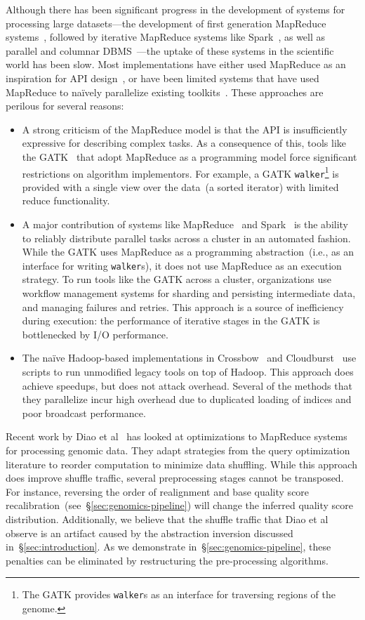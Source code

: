 \documentclass{acm_proc_article-sp}
\begin{document}
Although there has been significant progress in the development of systems for processing large
datasets---the development of first generation MapReduce systems~\cite{dean04}, followed by
iterative MapReduce systems like Spark~\cite{zaharia10}, as well as parallel and columnar
DBMS~\cite{abadi06, lamb12}---the uptake of these systems in the scientific world has been slow.
Most implementations have either used MapReduce as an inspiration for API
design~\cite{mckenna10}, or have been limited systems that have used MapReduce to na\"{i}vely
parallelize existing toolkits~\cite{langmead09, schatz09}. These approaches are perilous for several
reasons:

\begin{itemize}
\item A strong criticism of the MapReduce model is that the API is insufficiently expressive
for describing complex tasks. As a consequence of this, tools like the GATK~\cite{mckenna10} that
adopt MapReduce as a programming model force significant restrictions on algorithm implementors. For
example, a GATK \texttt{walker}\footnote{The GATK provides \texttt{walker}s as an interface for
traversing regions of the genome.} is provided with a single view over the data~(a sorted iterator) with limited reduce
functionality.
\item A major contribution of systems like MapReduce~\cite{dean08} and Spark~\cite{zaharia10,
zaharia12} is the ability to reliably distribute parallel tasks across a cluster in an automated fashion. While
the GATK uses MapReduce as a programming abstraction~(i.e., as an interface for writing
\texttt{walker}s), it does not use MapReduce as an execution strategy. To run tools like the GATK across
a cluster, organizations use workflow management systems for sharding and persisting intermediate
data, and managing failures and retries. This approach is a source of inefficiency during execution: the performance of
iterative stages in the GATK is bottlenecked by I/O performance.
\item The na\"{i}ve Hadoop-based implementations in Crossbow~\cite{langmead09} and
Cloudburst~\cite{schatz09} use scripts to run unmodified legacy tools on top of Hadoop. This approach does
achieve speedups, but does not attack overhead. Several of the methods that they parallelize incur
high overhead due to duplicated loading of indices and poor broadcast performance.
\end{itemize}

Recent work by Diao et al~\cite{diao15} has looked at optimizations to MapReduce systems for
processing genomic data. They adapt strategies from the query optimization literature to reorder
computation to minimize data shuffling. While this approach does improve shuffle traffic, several
preprocessing stages cannot be transposed. For instance, reversing the order of realignment and
base quality score recalibration~(see~\S\ref{sec:genomics-pipeline}) will change the inferred quality
score distribution. Additionally, we believe that the shuffle traffic that Diao et al observe is an artifact
caused by the abstraction inversion discussed in~\S\ref{sec:introduction}. As we demonstrate
in~\S\ref{sec:genomics-pipeline}, these penalties can be eliminated by restructuring the pre-processing
algorithms.
\end{document}

